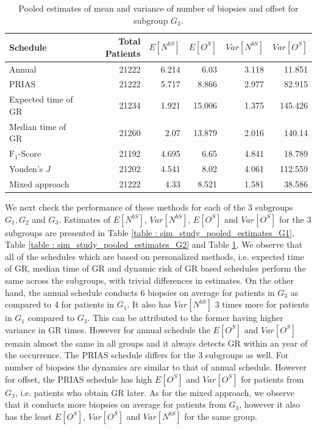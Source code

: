 \begin{table}[!htb]
\centering
\captionsetup{justification=centering}
\caption{Pooled estimates of mean and variance of number of biopsies and offset for subgroup $G_3$.}
\label{table : sim_study_pooled_estimates_G3}
\begin{tabular}{@{}lrrrrr@{}}
\toprule
Schedule           & Total Patients & $E[N^{bS}]$ & $E[O^{S}]$ & $Var[N^{bS}]$ & $Var[O^S]$ \\ \midrule
Annual              & 21222                  & 6.214           & 6.03                & 3.118          & 11.851             \\
PRIAS              & 21222                  & 5.717           & 8.866               & 2.977          & 82.915             \\
Expected time of GR  & 21234                  & 1.921           & 15.006              & 1.375          & 145.426            \\
Median time of GR   & 21260                  & 2.07            & 13.879              & 2.016          & 140.14             \\
$\text{F}_1$-Score           & 21192                  & 4.695           & 6.65                & 4.841          & 18.789             \\
Youden's $J$              & 21202                  & 4.541           & 8.02                & 4.061          & 112.559             \\
Mixed approach     & 21222                  & 4.33            & 8.521               & 1.581          & 38.586             \\ \bottomrule
\end{tabular}
\end{table}

We next check the performance of these methods for each of the 3 subgroups $G_1, G_2$ and $G_3$. Estimates of $E[N^{bS}]$, $Var[N^{bS}]$, $E[O^S]$ and $Var[O^S]$ for the 3 subgroups are presented in Table \ref{table : sim_study_pooled_estimates_G1}, Table \ref{table : sim_study_pooled_estimates_G2} and Table \ref{table : sim_study_pooled_estimates_G3}. We observe that all of the schedules which are based on personalized methods, i.e. expected time of GR, median time of GR and dynamic risk of GR based schedules perform the same across the subgroups, with trivial differences in estimates. On the other hand, the annual schedule conducts 6 biopsies on average for patients in $G_3$ as compared to 4 for patients in $G_1$. It also has $Var[N^{bS}]$ 3 times more for patients in $G_1$ compared to $G_3$. This can be attributed to the former having higher variance in GR times. However for annual schedule the $E[O^S]$ and $Var[O^S]$ remain almost the same in all groups and it always detects GR within an year of the occurrence. The PRIAS schedule differs for the 3 subgroups as well. For number of biopsies the dynamics are similar to that of annual schedule. However for offset, the PRIAS schedule has high $E[O^S]$ and $Var[O^S]$ for patients from $G_3$, i.e. patients who obtain GR later. As for the mixed approach, we observe that it conducts more biopsies on average for patients from $G_3$, however it also has the least $E[O^S]$, $Var[O^S]$ and $Var[N^{bS}]$ for the same group.\\

